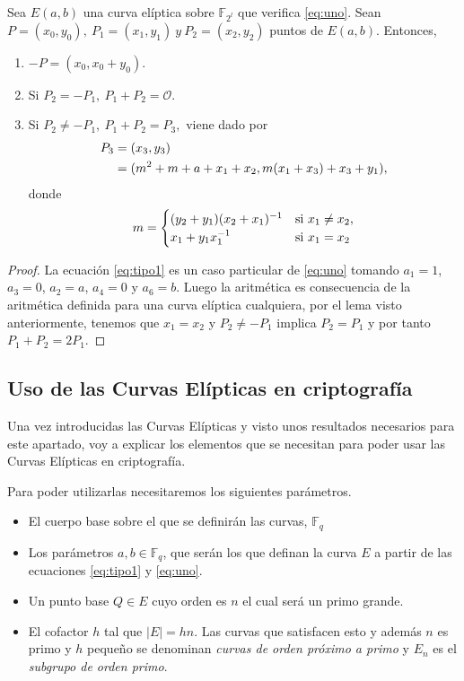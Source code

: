 \begin{proposicion}
	Sea $E(a,b)$ una curva elíptica sobre $\mathbb{F}_{2^l}$ que verifica \eqref{eq:uno}. Sean $P=(x_0,y_0),\: P_1=(x_1,y_1)\:y\:P_2=(x_2,y_2)$ puntos de $E(a,b)$. Entonces, 
	\begin{enumerate}
		\item $-P=(x_0,x_0+y_0)$.
		\item Si $P_2=-P_1,\: P_1+P_2=\mathcal{O}$.
		\item Si $P_2\neq-P_1,\:P_1+P_2=P_3,$ viene dado por
		\begin{equation}
			\begin{split}
					P_3 &=(x_3,y_3)\notag\\
						&=(m^2+m+a+x_1+x_2,m(x_1+x_3)+x_3+y_1)\notag,
			\end{split}
		\end{equation}
		donde 
		\begin{equation}
		  m =
			\begin{cases}
				(y_2+y_1)(x_2+x_1)^{-1} & \text{si } x_1\neq x_2, \\
				x_1+y_1x_1^{-1} & \text{si } x_1=x_2
			\end{cases}       
			\notag
		\end{equation}
	\end{enumerate}
\end{proposicion}
\begin{proof}
	La ecuación \eqref{eq:tipo1} es un caso particular de \eqref{eq:uno} tomando $a_1=1$, $a_3=0$, $a_2=a$, $a_4=0$ y $a_6=b$. Luego la aritmética es consecuencia de la aritmética definida para una curva elíptica cualquiera, por el lema visto anteriormente, tenemos que $x_1=x_2$ y $P_2\neq-P_1$ implica $P_2=P_1$ y por tanto $P_1+P_2=2P_1$.
\end{proof}

\subsection{Uso de las Curvas Elípticas en criptografía}
Una vez introducidas las Curvas Elípticas y visto unos resultados necesarios para este apartado, voy a explicar los elementos que se necesitan para poder usar las Curvas Elípticas en criptografía.

Para poder utilizarlas necesitaremos los siguientes parámetros.
\begin{itemize}
	\item El cuerpo base sobre el que se definirán las curvas, $\mathbb{F}_q$
	\item Los parámetros $a,b \in \mathbb{F}_q$, que serán los que definan la curva $E$ a partir de las ecuaciones \eqref{eq:tipo1} y \eqref{eq:uno}.
	\item Un punto base $Q\in E$ cuyo orden es $n$ el cual será un primo grande.
	\item El cofactor $h$ tal que $|E|=hn$. Las curvas que satisfacen esto y además $n$ es primo y $h$ pequeño se denominan \emph{curvas de orden próximo a primo} y $E_n$ es el \emph{subgrupo de orden primo}.	
\end{itemize}

